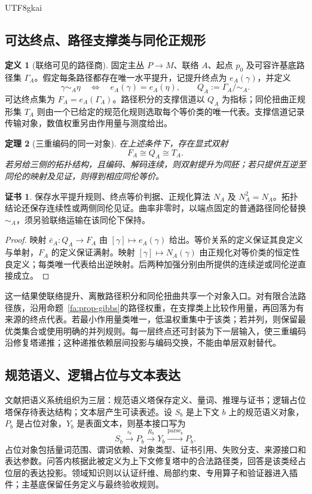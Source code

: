 \documentclass[11pt,a4paper]{article}
\theoremstyle{plain}
\newtheorem{theorem}{定理}[section]
\theoremstyle{definition}
\newtheorem{definition}[theorem]{定义}
\newtheorem*{certificate}{证书}
\theoremstyle{remark}
\begin{document}
\begin{CJK*}{UTF8}{gkai}
\subsection{可达终点、路径支撑类与同伦正规形}

\begin{definition}[联络可见的路径商]
固定主丛 $P\to M$、联络 $A$、起点 $p_0$ 及可容许基底路径集 $\Gamma_A$。假定每条路径都存在唯一水平提升，记提升终点为 $e_A(\gamma)$，并定义
\[
 \gamma\sim_A\eta\quad\Longleftrightarrow\quad e_A(\gamma)=e_A(\eta),
 \qquad Q_A:=\Gamma_A/\sim_A.
\]
可达终点集为 $F_A=e_A(\Gamma_A)$。路径积分的支撑信道以 $Q_A$ 为指标；同伦扭曲正规形集 $T_A$ 则由一个已给定的规范化规则选取每个等价类的唯一代表。支撑信道记录传输对象，数值权重另由作用量与测度给出。
\end{definition}

\begin{theorem}[三重编码的同一对象]
\label{ss:three-encoding}
在上述条件下，存在显式双射
\[
 F_A\cong Q_A\cong T_A.
\]
若另给三侧的拓扑结构，且编码、解码连续，则双射提升为同胚；若只提供互逆至同伦的映射及见证，则得到相应同伦等价。
\end{theorem}
\begin{certificate}
保存水平提升规则、终点等价判据、正规化算法 $N_A$ 及 $N_A^2=N_A$。拓扑结论还保存连续性或两侧同伦见证。曲率非零时，以端点固定的普通路径同伦替换 $\sim_A$，须另验联络运输在该同伦下保持。
\end{certificate}
\begin{proof}
映射 $\bar e_A:Q_A\to F_A$ 由 $[\gamma]\mapsto e_A(\gamma)$ 给出。等价关系的定义保证其良定义与单射，$F_A$ 的定义保证满射。映射 $[\gamma]\mapsto N_A(\gamma)$ 由正规化对等价类的恒定性良定义；每类唯一代表给出逆映射。后两种加强分别由所提供的连续逆或同伦逆直接成立。
\end{proof}

这一结果使联络提升、离散路径积分和同伦扭曲共享一个对象入口。对有限合法路径族，沿用命题~\ref{fa:prop-gibbs}的路径权重，在支撑类上比较作用量，再回落为有来源的终点代表。若最小作用量类唯一，低温权重集中于该类；若并列，则保留最优类集合或使用明确的并列规则。每一层终点还可封装为下一层输入，使三重编码沿修复塔递推；这种递推依赖层间投影与编码交换，不能由单层双射替代。

\subsection{规范语义、逻辑占位与文本表达}

文献\cite{S20}把语义系统组织为三层：规范语义塔保存定义、量词、推理与证书；逻辑占位塔保存待表达结构；文本层产生可读表述。设 $S_b$ 是上下文 $b$ 上的规范语义对象，$P_b$ 是占位对象，$Y_b$ 是表面文本，则基本接口写为
\[
 S_b\xrightarrow{\iota_b}P_b\xrightarrow{R_b}Y_b
 \xrightarrow{\operatorname{parse}_b}P_b.
\]
占位对象包括量词范围、谓词依赖、对象类型、证书引用、失败分支、来源接口和表达参数。问答内核据此被定义为上下文修复塔中的合法路径类，回答是该类经占位层的表达投影。领域知识则以认证纤维、局部约束、专用算子和验证器进入插件；主基底保留任务定义与最终验收规则。


\end{CJK*}
\end{document}
